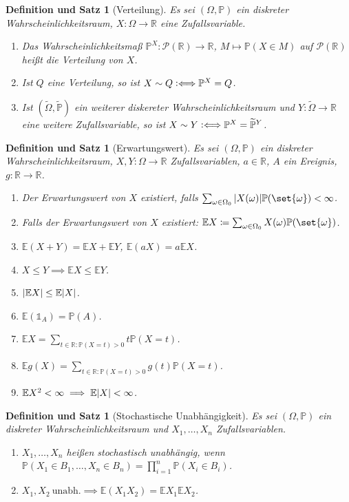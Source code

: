 \documentclass[a4paper]{article}
\theoremstyle{marginbreak}
\newtheorem{defsatz}[definition]{Definition und Satz}
\newcommand{\defiff}{\mathrel{\vcentcolon\Longleftrightarrow}}
\renewcommand{\P}{\mathbb{P}}
\newcommand{\R}{\mathbb{R}}
\newcommand{\E}{\mathbb{E}}
\begin{document}
	\begin{defsatz}[Verteilung]
		Es sei $(\Omega,\P)$ ein diskreter Wahrscheinlichkeitsraum, $X\colon\Omega\to\R$ eine
		Zufallsvariable.
		\begin{enumerate}[label=(\alph*)]
			\item Das Wahrscheinlichkeitsmaß $\P^X\colon \mathcal{P}(\R)\to\R$, $M\mapsto\P(X\in M)$
				auf $\mathcal{P}(\R)$ heißt die
				Verteilung von $X$.
			\item Ist $Q$ eine Verteilung, so ist $X\sim Q\defiff \P^X=Q$.
			\item Ist $(\widetilde{\Omega}, \widetilde{\P})$ ein weiterer diskereter Wahrscheinlichkeitsraum und $Y\colon\widetilde{\Omega}\to\R$
				eine weitere Zufallsvariable, so ist $X\sim Y\defiff \P^X=\widetilde{\P}^Y$.
		\end{enumerate}
	\end{defsatz}
	\begin{defsatz}[Erwartungswert]
		Es sei $(\Omega,\P)$ ein diskreter Wahrscheinlichkeitsraum, $X, Y\colon\Omega\to\R$ Zufallsvariablen, $a\in\R$, $A$ ein Ereignis,
		$g\colon\R\to\R$.
		\begin{enumerate}[label=(\alph*)]
			\item Der Erwartungswert von $X$ existiert, falls $\sum_{\omega\in\Omega_0}\abs{X(\omega)}\P(\set{\omega}) < \infty$.
			\item Falls der Erwartungswert von $X$ existiert: $\E X\coloneqq \sum_{\omega\in\Omega_0}X(\omega)\P(\set{\omega})$.
			\item $\E(X + Y) = \E X + \E Y$, $\E(aX) = a\E X$.
			\item $X\leq Y\implies \E X\leq\E Y$.
			\item $\abs{\E X}\leq\E\abs{X}$.
			\item $\E(\mathds{1}_A)=\P(A)$.
			\item $\E X = \sum_{t\in\mathbb{R}:\P(X=t)>0} t\P(X=t)$.
			\item $\E g(X) = \sum_{t\in\mathbb{R}:\P(X=t)>0} g(t)\P(X=t)$.
			\item $\E X^2<\infty\implies \E\abs{X}<\infty$.
		\end{enumerate}
	\end{defsatz}
	\begin{defsatz}[Stochastische Unabhängigkeit]
		Es sei $(\Omega,\P)$ ein diskreter Wahrscheinlichkeitsraum und $X_1,\ldots,X_n$ Zufallsvariablen.
		\begin{enumerate}[label=(\alph*)]
			\item $X_1,\ldots,X_n$ heißen stochastisch unabhängig, wenn $\P(X_1\in B_1,\ldots,X_n\in B_n)=\prod_{i=1}^n\P(X_i\in B_i)$.
			\item $X_1, X_2~\text{unabh.}\implies \E(X_1X_2)=\E X_1 \E X_2$.
		\end{enumerate}
	\end{defsatz}
\end{document}
